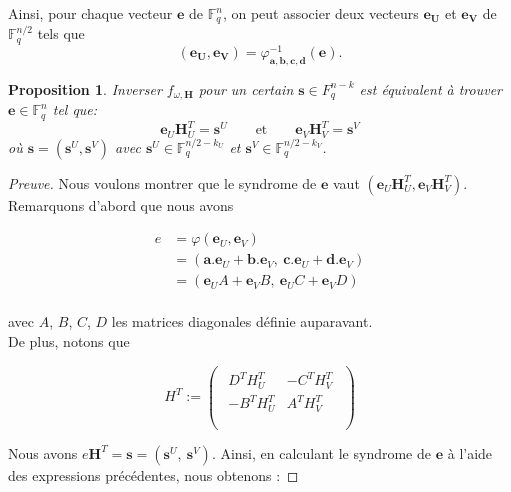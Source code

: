 \documentclass[12pt]{article}
\theoremstyle{plain}
\newtheorem{propo}[thm]{Proposition}
\newcommand{\F}{\mathbb{F}}
\newcommand{\e}{\mathbf{e}}
\newcommand{\s}{\mathbf{s}}
\begin{document}
\noindent Ainsi, pour chaque vecteur $\mathbf{e}$ de $\F_q^n$, on peut associer deux vecteurs $\mathbf{e_U}$ et $\mathbf{e_V}$ de $\F_q^{n/2}$ tels que 
$$ (\mathbf{e_U},\mathbf{e_V}) = \varphi^{-1}_{\mathbf{a},\mathbf{b},\mathbf{c},\mathbf{d}}(\mathbf{e}).$$

\begin{propo} Inverser $f_{\omega,\mathbf{H}}$ pour un certain $\mathbf{s} \in F_q^{n-k}$ est équivalent à trouver $\mathbf{e} \in \F_q^n$ tel que:
$$ \mathbf{e}_U\mathbf{H}_U^T = \mathbf{s}^U \qquad \text{et} \qquad \mathbf{e}_V\mathbf{H}_V^T = \mathbf{s}^V $$
où $\mathbf{s} = (\mathbf{s}^U, \mathbf{s}^V)$ avec $\mathbf{s}^U \in \F_q^{n/2-k_U}$ et $\mathbf{s}^V \in \F_q^{n/2-k_V}$.
\end{propo}

\begin{proof}[Preuve]
Nous voulons montrer que le syndrome de $\e$ vaut $(\e_U\mathbf{H}_U^T,\e_V\mathbf{H}_V^T)$.
Remarquons d'abord que nous avons

\begin{equation*}
\begin{split}
e &= \varphi(\e_U,\e_V)\\
&= (\mathbf{a}.\e_U + \mathbf{b}.\e_V,\ \mathbf{c}.\e_U + \mathbf{d}.\e_V)\\
&= (\e_U A + \e_V B,\ \e_U C + \e_V D)\\
\end{split}
\end{equation*}

\noindent avec $A$, $B$, $C$, $D$ les matrices diagonales définie auparavant.\\
De plus, notons que

\vspace{0.1in}
$$ 
H^T :=
\begin{pmatrix}
\begin{array}{c|c}
D^TH_U^T & -C^TH_V^T \\
 \hline 

-B^TH_U^T & A^TH_V^T \\
\end{array} \\
\end{pmatrix}
$$
\vspace{0.1in}

\noindent Nous avons $e\mathbf{H}^T = \s = (\s^U,\ \s^V)$. Ainsi, en calculant le syndrome de $\e$ à l'aide des expressions précédentes, nous obtenons :


\end{proof}
\end{document}
